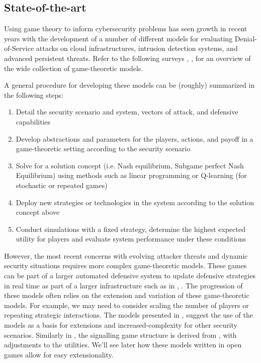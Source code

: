 \documentclass[11pt,titlepage,dvipsnames,table,xcdraw,english]{article}
\begin{document}
\subsection{State-of-the-art}
\label{designPatterns:state}
Using game theory to inform cybersecurity problems has seen growth in recent years with the development of a number of different models for evaluating Denial-of-Service attacks on cloud infrastructures, intrusion detection systems, and advanced persistent threats. Refer to the following surveys \cite{Pawlick2019}, \cite{Hausken2024}, \cite{Manshaei2013} for an overview of the wide collection of game-theoretic models. 

A general procedure for developing these models can be (roughly) summarized in the following steps: 
\begin{enumerate}
	\item Detail the security scenario and system, vectors of attack, and defensive capabilities
	\item Develop abstractions  and parameters for the players, actions, and payoff in a game-theoretic setting according to the security scenario
	\item Solve for a solution concept (i.e. Nash equilibrium, Subgame perfect Nash Equilibrium) using methods such as linear programming or Q-learning (for stochastic or repeated games)
	\item Deploy new strategies or technologies in the system according to the solution concept above
	\item Conduct simulations with a fixed strategy, determine the highest expected utility for players and evaluate system performance under these conditions
\end{enumerate}

However, the most recent concerns with evolving attacker threats and dynamic security situations requires more complex game-theoretic models. These games can be part of a larger automated defensive system to update defensive strategies in real time as part of a larger infrastructure such as in \cite{Jin2018}, \cite{Zhu2012}. The progression of these models often relies on the extension and variation of these game-theoretic models. For example, we may need to consider scaling the number of players or repeating strategic interactions. The models presented in \cite{Chen2009}, \cite{Nochenson2012} suggest the use of the models as a basis for extensions and increased-complexity for other security scenarios. Similarly in \cite{Pawlick2015}, the signalling game structure is derived from \cite{Carroll2009}, with adjustments to the utilities. We'll see later how these models written in open games allow for easy extensionality.
\end{document}
